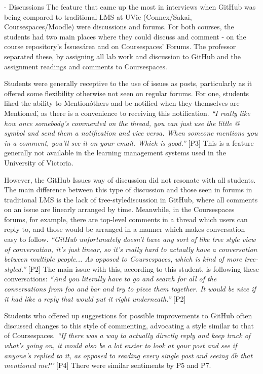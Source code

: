- Discussions
The feature that came up the most in interviews when GitHub was being compared to traditional LMS at UVic (Connex/Sakai, Coursespaces/Moodle) were discussions and forums. For both courses, the students had two main places where they could discuss and comment - on the course repository's \'Issues\' area and on Coursespaces' Forums. The professor separated these, by assigning all lab work and discussion to GitHub and the assignment readings and comments to Coursespaces.

Students were generally receptive to the use of issues as posts, particularly as it offered some flexibility otherwise not seen on regular forums. For one, students liked the ability to \'Mention\' others and be notified when they themselves are \'Mentioned\', as there is a convenience to receiving this notification. \textit{``I really like how once somebody's commented on the thread, you can just use the little @ symbol and send them a notification and vice versa. When someone mentions you in a comment, you'll see it on your email. Which is good.''} [P3] This is a feature generally not available in the learning management systems used in the University of Victoria.

However, the GitHub Issues way of discussion did not resonate with all students. The main difference between this type of discussion and those seen in forums in traditional LMS is the lack of \'tree-style\' discussion in GitHub, where all comments on an issue are linearly arranged by time. Meanwhile, in the Coursespaces forums, for example, there are top-level comments in a thread which users can reply to, and those would be arranged in a manner which makes conversation easy to follow. \textit{``GitHub unfortunately doesn't have any sort of like tree style view of conversation, it's just linear, so it's really hard to actually have a conversation between multiple people... As opposed to Coursespaces, which is kind of more tree-styled.''} [P2] The main issue with this, according to this student, is following these conversations: \textit{``And you literally have to go and search for all of the conversations from foo and bar and try to piece them together. It would be nice if it had like a reply that would put it right underneath.''} [P2]

Students who offered up suggestions for possible improvements to GitHub often discussed changes to this style of commenting, advocating a style similar to that of Coursespaces. \textit{``If there was a way to actually directly reply and keep track of what's going on, it would also be a lot easier to look at your post and see if anyone's replied to it, as opposed to reading every single post and seeing \'oh that mentioned me!\'''} [P4] There were similar sentiments by P5 and P7.

